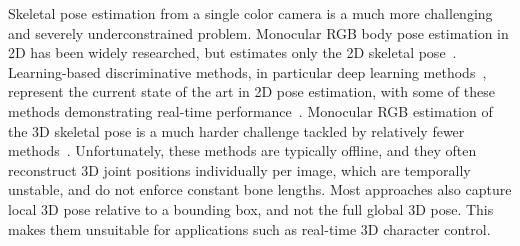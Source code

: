 \documentclass[acmtog]{acmart}
\newcommand{\change}[1]{{#1}}
\begin{document}
Skeletal pose estimation from a single color camera is a much more challenging and severely underconstrained problem.
\change{Monocular} RGB body pose estimation in 2D has been widely researched, but estimates only the 2D skeletal pose~\cite{wei_cpm_cvpr16,felzenszwalb_pictorial_ijcv05,felzenszwalb_dpm_pami10,bourdev2009poselets,ferrari_pose_cvpr2009,pishchulin_strong_iccv13}.
Learning-based discriminative methods, in particular deep learning methods~\cite{insafutdinov_deepercut_eccv16,newell_stacked_hourglass_eccv16,tompson_cnn_graph_pose_nips14,lifshitz_deep_consensus_eccv16}, represent the current state of the art in 2D pose estimation, with some of these methods demonstrating real-time performance~\cite{wei_cpm_cvpr16,cao2016realtime}.
\change{Monocular} RGB estimation of the 3D skeletal pose is a much harder challenge tackled by \change{relatively fewer} methods~\cite{tekin_motion_comp_cvpr16,tekin_fusion_arxiv16,zhou_deep_kinematic_arxiv16,zhou_convexrelaxation_cvpr2015,zhou_sparseness_deepness_cvpr15,bogo_smpl_eccv16}.
Unfortunately, these methods are typically offline, and they often reconstruct 3D joint positions individually per image, which are temporally unstable, and do not enforce constant bone lengths.
Most approaches also capture local 3D pose relative to a bounding box, and not the full global 3D pose.
\change{This makes them unsuitable} for applications such as real-time 3D character control.
\end{document}
